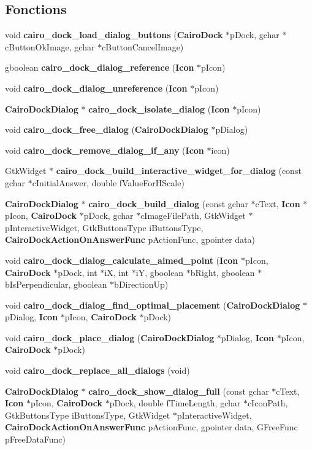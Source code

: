 \subsection*{Fonctions}
\begin{CompactItemize}
\item 
void {\bf cairo\_\-dock\_\-load\_\-dialog\_\-buttons} ({\bf Cairo\-Dock} $\ast$p\-Dock, gchar $\ast$c\-Button\-Ok\-Image, gchar $\ast$c\-Button\-Cancel\-Image)
\item 
gboolean {\bf cairo\_\-dock\_\-dialog\_\-reference} ({\bf Icon} $\ast$p\-Icon)
\item 
void {\bf cairo\_\-dock\_\-dialog\_\-unreference} ({\bf Icon} $\ast$p\-Icon)
\item 
{\bf Cairo\-Dock\-Dialog} $\ast$ {\bf cairo\_\-dock\_\-isolate\_\-dialog} ({\bf Icon} $\ast$p\-Icon)
\item 
void {\bf cairo\_\-dock\_\-free\_\-dialog} ({\bf Cairo\-Dock\-Dialog} $\ast$p\-Dialog)
\item 
void {\bf cairo\_\-dock\_\-remove\_\-dialog\_\-if\_\-any} ({\bf Icon} $\ast$icon)
\item 
Gtk\-Widget $\ast$ {\bf cairo\_\-dock\_\-build\_\-interactive\_\-widget\_\-for\_\-dialog} (const gchar $\ast$c\-Initial\-Answer, double f\-Value\-For\-HScale)
\item 
{\bf Cairo\-Dock\-Dialog} $\ast$ {\bf cairo\_\-dock\_\-build\_\-dialog} (const gchar $\ast$c\-Text, {\bf Icon} $\ast$p\-Icon, {\bf Cairo\-Dock} $\ast$p\-Dock, gchar $\ast$c\-Image\-File\-Path, Gtk\-Widget $\ast$p\-Interactive\-Widget, Gtk\-Buttons\-Type i\-Buttons\-Type, {\bf Cairo\-Dock\-Action\-On\-Answer\-Func} p\-Action\-Func, gpointer data)
\item 
void {\bf cairo\_\-dock\_\-dialog\_\-calculate\_\-aimed\_\-point} ({\bf Icon} $\ast$p\-Icon, {\bf Cairo\-Dock} $\ast$p\-Dock, int $\ast$i\-X, int $\ast$i\-Y, gboolean $\ast$b\-Right, gboolean $\ast$b\-Is\-Perpendicular, gboolean $\ast$b\-Direction\-Up)
\item 
void {\bf cairo\_\-dock\_\-dialog\_\-find\_\-optimal\_\-placement} ({\bf Cairo\-Dock\-Dialog} $\ast$p\-Dialog, {\bf Icon} $\ast$p\-Icon, {\bf Cairo\-Dock} $\ast$p\-Dock)
\item 
void {\bf cairo\_\-dock\_\-place\_\-dialog} ({\bf Cairo\-Dock\-Dialog} $\ast$p\-Dialog, {\bf Icon} $\ast$p\-Icon, {\bf Cairo\-Dock} $\ast$p\-Dock)
\item 
void {\bf cairo\_\-dock\_\-replace\_\-all\_\-dialogs} (void)
\item 
{\bf Cairo\-Dock\-Dialog} $\ast$ {\bf cairo\_\-dock\_\-show\_\-dialog\_\-full} (const gchar $\ast$c\-Text, {\bf Icon} $\ast$p\-Icon, {\bf Cairo\-Dock} $\ast$p\-Dock, double f\-Time\-Length, gchar $\ast$c\-Icon\-Path, Gtk\-Buttons\-Type i\-Buttons\-Type, Gtk\-Widget $\ast$p\-Interactive\-Widget, {\bf Cairo\-Dock\-Action\-On\-Answer\-Func} p\-Action\-Func, gpointer data, GFree\-Func p\-Free\-Data\-Func)

\end{CompactItemize}
